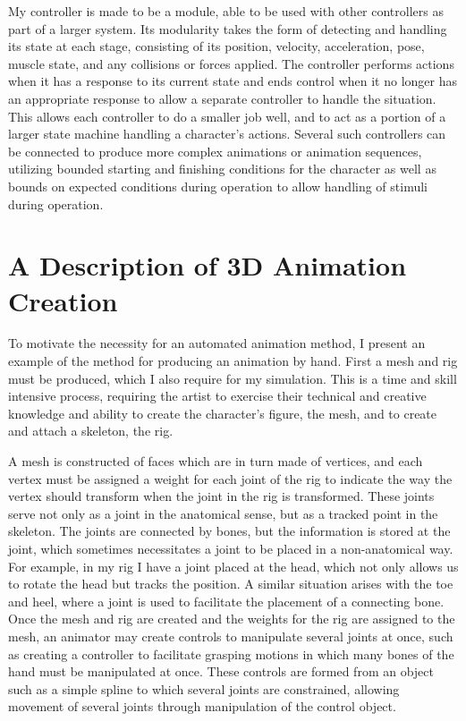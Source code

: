 My controller is made to be a module, able to be used with other controllers as part of a larger system.  Its modularity takes the form of detecting and handling its state at each stage, consisting of its position, velocity, acceleration, pose, muscle state, and any collisions or forces applied. The controller performs actions when it has a response to its current state and ends control when it no longer has an appropriate response to allow a separate controller to handle the situation.  This allows each controller to do a smaller job well, and to act as a portion of a larger state machine handling a character's actions. Several such controllers can be connected to produce more complex animations or animation sequences, utilizing bounded starting and finishing conditions for the character as well as bounds on expected conditions during operation to allow handling of stimuli during operation.


 
\section{A Description of 3D Animation Creation}
\label{section:anim_ex}
To motivate the necessity for an automated animation method, I present an example of the method for producing an animation by hand.  First a mesh and rig must be produced, which I also require for my simulation.  This is a time and skill intensive process, requiring the artist to exercise their technical and creative knowledge and ability to create the character's figure, the mesh, and to create and attach a skeleton, the rig.  

A mesh is constructed of faces which are in turn made of vertices, and each vertex must be assigned a weight for each joint of the rig to indicate the way the vertex should transform when the joint in the rig is transformed.  These joints serve not only as a joint in the anatomical sense, but as a tracked point in the skeleton.  The joints are connected by bones, but the information is stored at the joint, which sometimes necessitates a joint to be placed in a non-anatomical way.  For example, in my rig I have a joint placed at the head, which not only allows us to rotate the head but tracks the position.  A similar situation arises with the toe and heel, where a joint is used to facilitate the placement of a connecting bone.  Once the mesh and rig are created and the weights for the rig are assigned to the mesh, an animator may create controls to manipulate several joints at once, such as creating a controller to facilitate grasping motions in which many bones of the hand must be manipulated at once.  These controls are formed from an object such as a simple spline to which several joints are constrained, allowing movement of several joints through manipulation of the control object.


